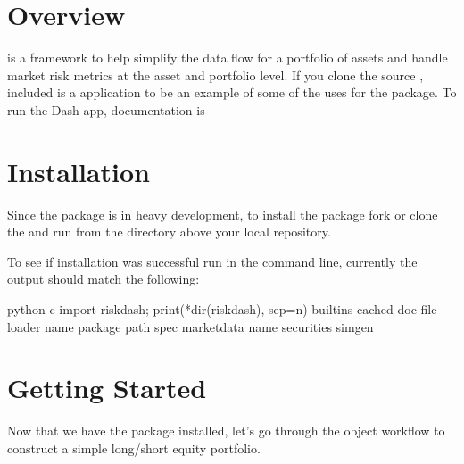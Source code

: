 \documentclass[letterpaper,10pt,english]{sphinxmanual}
\begin{document}
\section{Overview}
\label{\detokenize{gettingstarted:overview}}
 is a framework to
help simplify the data flow for a portfolio of assets and handle market
risk metrics at the asset and portfolio level. If you clone the source
, included is a
 application to be an example of some of
the uses for the package. To run the Dash app, documentation is


\section{Installation}
\label{\detokenize{gettingstarted:installation}}
Since the package is in heavy development, to install the package fork
or clone the  and
run  from the directory above your local
repository.

To see if installation was successful run
 in
the command line, currently the output should match the following:

%
\begin{sphinxVerbatim}[commandchars=\\\{\}]
\PYGZdl{} python \PYGZhy{}c \PYGZsq{}import risk\PYGZus{}dash; print(*dir(risk\PYGZus{}dash), sep=\PYGZdq{}\PYGZbs{}n\PYGZdq{})\PYGZsq{}
\PYGZus{}\PYGZus{}builtins\PYGZus{}\PYGZus{}
\PYGZus{}\PYGZus{}cached\PYGZus{}\PYGZus{}
\PYGZus{}\PYGZus{}doc\PYGZus{}\PYGZus{}
\PYGZus{}\PYGZus{}file\PYGZus{}\PYGZus{}
\PYGZus{}\PYGZus{}loader\PYGZus{}\PYGZus{}
\PYGZus{}\PYGZus{}name\PYGZus{}\PYGZus{}
\PYGZus{}\PYGZus{}package\PYGZus{}\PYGZus{}
\PYGZus{}\PYGZus{}path\PYGZus{}\PYGZus{}
\PYGZus{}\PYGZus{}spec\PYGZus{}\PYGZus{}
market\PYGZus{}data
name
securities
simgen
\end{sphinxVerbatim}


\section{Getting Started}
\label{\detokenize{gettingstarted:getting-started}}
Now that we have the package installed, let’s go through the object
workflow to construct a simple long/short equity portfolio.
\end{document}
